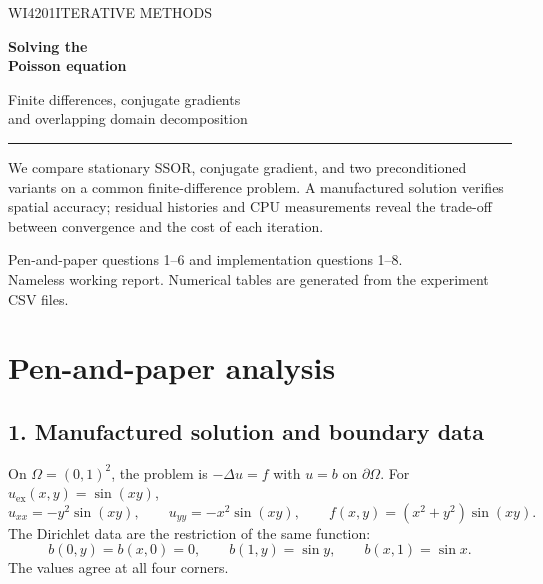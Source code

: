 \documentclass[10pt,a4paper]{article}
\begin{document}
\begin{titlepage}
\thispagestyle{empty}
\vspace*{18mm}
{\large\sffamily\color{muted}WI4201\quad ITERATIVE METHODS}\par
\vspace{15mm}
{\fontsize{34}{38}\selectfont\bfseries\color{ink}Solving the\\Poisson equation\par}
\vspace{9mm}
{\Large Finite differences, conjugate gradients\\and overlapping domain decomposition\par}
\vspace{13mm}
{\color{ink}\rule{\linewidth}{1pt}}\par
\vspace{7mm}
\begin{minipage}{.82\linewidth}
We compare stationary SSOR, conjugate gradient, and two preconditioned
variants on a common finite-difference problem. A manufactured solution
verifies spatial accuracy; residual histories and CPU measurements reveal
the trade-off between convergence and the cost of each iteration.
\end{minipage}
\vfill
{\small\color{muted}Pen-and-paper questions 1--6 and implementation questions 1--8.\\
Nameless working report. Numerical tables are generated from the experiment CSV files.}
\end{titlepage}
\setcounter{page}{1}

\section{Pen-and-paper analysis}
\subsection{1. Manufactured solution and boundary data}
On $\Omega=(0,1)^2$, the problem is $-\Delta u=f$ with $u=b$ on
$\partial\Omega$. For $u_{\mathrm{ex}}(x,y)=\sin(xy)$,
\[
 u_{xx}=-y^2\sin(xy),\qquad u_{yy}=-x^2\sin(xy),\qquad
 \boxed{f(x,y)=(x^2+y^2)\sin(xy).}
\]
The Dirichlet data are the restriction of the same function:
\[
 b(0,y)=b(x,0)=0,\qquad b(1,y)=\sin y,\qquad b(x,1)=\sin x.
\]
The values agree at all four corners.
\end{document}
